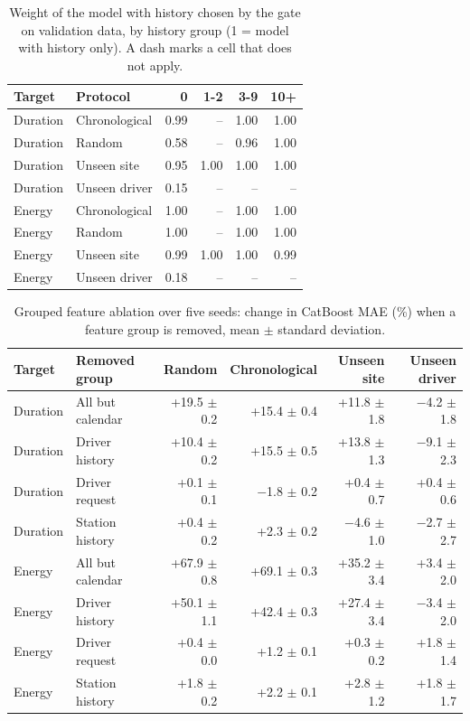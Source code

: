 \begin{table}[H]\centering\footnotesize
\caption{Weight of the model with history chosen by the gate on validation data, by history group (1 = model with history only). A dash marks a cell that does not apply.}\label{tab:s-gate}
\begin{tabular}{llrrrr}\toprule
Target & Protocol & 0 & 1-2 & 3-9 & 10+ \\\midrule
Duration & Chronological & 0.99 & -- & 1.00 & 1.00 \\
Duration & Random & 0.58 & -- & 0.96 & 1.00 \\
Duration & Unseen site & 0.95 & 1.00 & 1.00 & 1.00 \\
Duration & Unseen driver & 0.15 & -- & -- & -- \\
Energy & Chronological & 1.00 & -- & 1.00 & 1.00 \\
Energy & Random & 1.00 & -- & 1.00 & 1.00 \\
Energy & Unseen site & 0.99 & 1.00 & 1.00 & 0.99 \\
Energy & Unseen driver & 0.18 & -- & -- & -- \\
\bottomrule\end{tabular}\end{table}

\begin{table}[H]\centering\footnotesize
\caption{Grouped feature ablation over five seeds: change in CatBoost MAE (\%) when a feature group is removed, mean $\pm$ standard deviation.}\label{tab:s-ablation}
\begin{tabular}{llrrrr}\toprule
Target & Removed group & Random & Chronological & Unseen site & Unseen driver \\\midrule
Duration & All but calendar & +19.5 $\pm$ 0.2 & +15.4 $\pm$ 0.4 & +11.8 $\pm$ 1.8 & $-$4.2 $\pm$ 1.8 \\
Duration & Driver history & +10.4 $\pm$ 0.2 & +15.5 $\pm$ 0.5 & +13.8 $\pm$ 1.3 & $-$9.1 $\pm$ 2.3 \\
Duration & Driver request & +0.1 $\pm$ 0.1 & $-$1.8 $\pm$ 0.2 & +0.4 $\pm$ 0.7 & +0.4 $\pm$ 0.6 \\
Duration & Station history & +0.4 $\pm$ 0.2 & +2.3 $\pm$ 0.2 & $-$4.6 $\pm$ 1.0 & $-$2.7 $\pm$ 2.7 \\
Energy & All but calendar & +67.9 $\pm$ 0.8 & +69.1 $\pm$ 0.3 & +35.2 $\pm$ 3.4 & +3.4 $\pm$ 2.0 \\
Energy & Driver history & +50.1 $\pm$ 1.1 & +42.4 $\pm$ 0.3 & +27.4 $\pm$ 3.4 & $-$3.4 $\pm$ 2.0 \\
Energy & Driver request & +0.4 $\pm$ 0.0 & +1.2 $\pm$ 0.1 & +0.3 $\pm$ 0.2 & +1.8 $\pm$ 1.4 \\
Energy & Station history & +1.8 $\pm$ 0.2 & +2.2 $\pm$ 0.1 & +2.8 $\pm$ 1.2 & +1.8 $\pm$ 1.7 \\
\bottomrule\end{tabular}\end{table}

